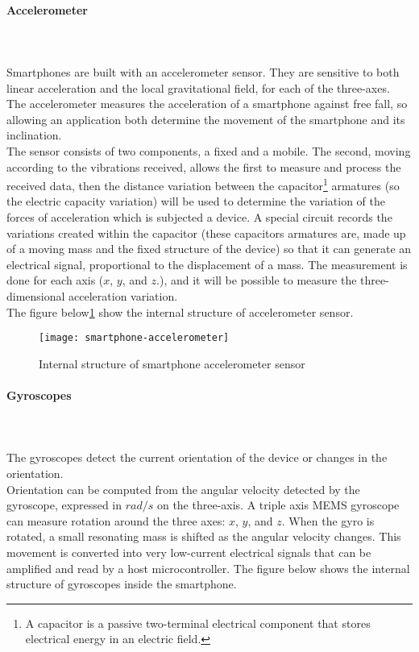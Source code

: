 \documentclass[tesi]{subfiles}
\begin{document}
\paragraph{{\Large Accelerometer}}\leavevmode\\\\
Smartphones are built with an accelerometer sensor. 
They are sensitive to both linear acceleration and the local gravitational field, for each of the three-axes. The accelerometer measures the acceleration of a smartphone against free fall, so allowing an application both determine the movement of the smartphone and its inclination.\\
The sensor consists of two components, a fixed and a mobile. 
The second, moving according to the vibrations received, allows the first to measure and process the received data, then the distance variation between the capacitor\footnote{A capacitor is a passive two-terminal electrical component that stores electrical energy in an electric field.} armatures (so the electric capacity variation) will be used to determine the variation of the forces of acceleration which is subjected a device. A special circuit records the variations created within the capacitor (these capacitors armatures are, made up of a moving mass and the fixed structure of the device) so that it can generate an electrical signal, proportional to the displacement of a mass.
The measurement is done for each axis ($x$, $y$, and $z$.), and it will be possible to measure the three-dimensional acceleration variation.\\The figure below\ref{fig:Sample smartphone accelerometer sensors} show the internal structure of accelerometer sensor.
\vspace{1cm}
\begin{figure}[H]
\centering
\texttt{[image: smartphone-accelerometer]}
\caption{Internal structure of smartphone accelerometer sensor}
\label{fig:Sample smartphone accelerometer sensors}
\end{figure}

\paragraph{{\Large Gyroscopes}}\leavevmode\\\\
The gyroscopes detect the current orientation of the device or
changes in the orientation.\\ Orientation can be computed from the
angular velocity detected by the gyroscope, expressed in $rad/s$ on the three-axis.  
A triple axis MEMS gyroscope can measure rotation around the three axes: $x$, $y$, and $z$.
When the gyro is rotated, a small resonating mass is shifted as the angular velocity changes. This movement is converted into very low-current electrical signals that can be amplified and read by a host microcontroller.
The figure below shows the internal structure of gyroscopes inside the smartphone.
\end{document}
